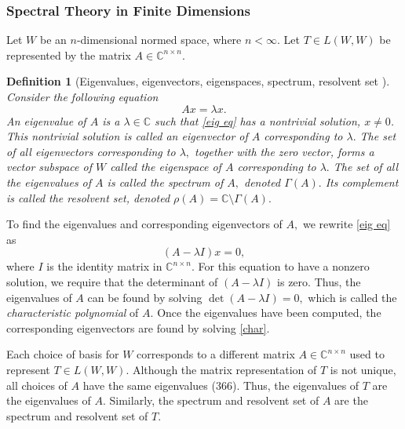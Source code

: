 \documentclass[12pt,a4paper]{article}
\theoremstyle{boldthm}
\theoremstyle{bolddefn}
\newtheorem{definition}[theorem]{Definition}
\begin{document}
\subsubsection{Spectral Theory in Finite Dimensions}

Let $W$ be an $n$-dimensional normed space, where $n < \infty.$ Let $T \in L(W, W)$ be represented by the matrix $A \in \mathbb{C}^{n \times n}.$ 

\begin{definition}[{Eigenvalues, eigenvectors, eigenspaces, spectrum, resolvent set \cite[7.1.1]{krey}}] \label{finite eig}
    Consider the following equation
    \begin{equation} \label{eig eq}
        Ax = \lambda x.
    \end{equation}
    An eigenvalue of $A$ is a $\lambda \in \mathbb{C}$ such that \eqref{eig eq} has a nontrivial solution, $x \ne 0$. This nontrivial solution is called an eigenvector of $A$ corresponding to $\lambda.$ The set of all eigenvectors corresponding to $\lambda,$ together with the zero vector, forms a vector subspace of $W$ called the eigenspace of $A$ corresponding to $\lambda.$ The set of all the eigenvalues of $A$ is called the spectrum of $A,$ denoted $\Gamma(A).$ Its complement is called the resolvent set, denoted $\rho(A) = \mathbb{C} \setminus \Gamma(A).$
\end{definition}

To find the eigenvalues and corresponding eigenvectors of $A,$ we rewrite \eqref{eig eq} as 
\begin{equation} \label{char}
    (A-\lambda I) x = 0,
\end{equation}
where $I$ is the identity matrix in $\mathbb{C}^{n\times n}.$ For this equation to have a nonzero solution, we require that the determinant of $(A-\lambda I)$ is zero. Thus, the eigenvalues of $A$ can be found by solving $\det (A-\lambda I) = 0,$ which is called the \textit{characteristic polynomial} of $A.$ Once the eigenvalues have been computed, the corresponding eigenvectors are found by solving \eqref{char}.


Each choice of basis for $W$ corresponds to a different matrix $A \in \mathbb{C}^{n \times n}$ used to represent $T \in L(W, W).$
Although the matrix representation of $T$ is not unique, all choices of $A$ have the same eigenvalues (366). Thus, the eigenvalues of $T$ are the eigenvalues of $A.$ Similarly, the spectrum and resolvent set of $A$ are the spectrum and resolvent set of $T.$ 
\end{document}
